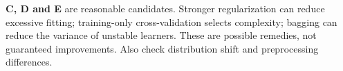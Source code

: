 \textbf{C, D and E} are reasonable candidates. Stronger regularization can reduce excessive fitting; training-only cross-validation selects complexity; bagging can reduce the variance of unstable learners. These are possible remedies, not guaranteed improvements. Also check distribution shift and preprocessing differences.
